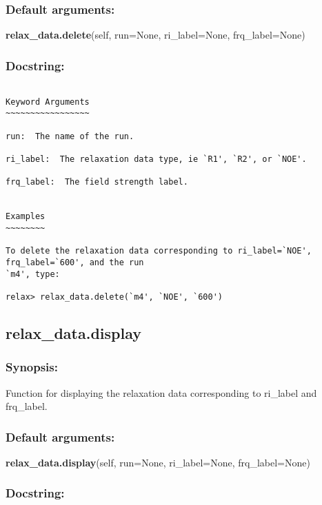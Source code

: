 \subsubsection{Default arguments:}

\textsf{\textbf{relax\_data.delete}(self, run=None, ri\_label=None, frq\_label=None)
}


\subsubsection{Docstring:}

{\scriptsize
\begin{verbatim}

Keyword Arguments
~~~~~~~~~~~~~~~~~

run:  The name of the run.

ri_label:  The relaxation data type, ie `R1', `R2', or `NOE'.

frq_label:  The field strength label.


Examples
~~~~~~~~

To delete the relaxation data corresponding to ri_label=`NOE', frq_label=`600', and the run
`m4', type:

relax> relax_data.delete(`m4', `NOE', `600')
\end{verbatim}
}



\newpage

\subsection{relax\_data.display}


\subsubsection{Synopsis:}

Function for displaying the relaxation data corresponding to ri\_label and frq\_label.

\subsubsection{Default arguments:}

\textsf{\textbf{relax\_data.display}(self, run=None, ri\_label=None, frq\_label=None)
}


\subsubsection{Docstring:}

